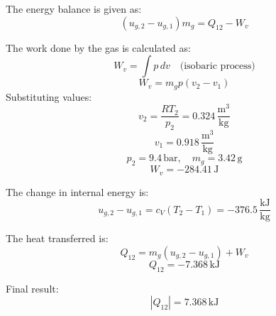The energy balance is given as:  
\[
(u_{g,2} - u_{g,1}) m_g = Q_{12} - W_v
\]  

The work done by the gas is calculated as:  
\[
W_v = \int p \, dv \quad \text{(isobaric process)}
\]  
\[
W_v = m_g p (v_2 - v_1)
\]  
Substituting values:  
\[
v_2 = \frac{R T_2}{p_2} = 0.324 \, \frac{\text{m}^3}{\text{kg}}
\]  
\[
v_1 = 0.918 \, \frac{\text{m}^3}{\text{kg}}
\]  
\[
p_2 = 9.4 \, \text{bar}, \quad m_g = 3.42 \, \text{g}
\]  
\[
W_v = -284.41 \, \text{J}
\]  

The change in internal energy is:  
\[
u_{g,2} - u_{g,1} = c_V (T_2 - T_1) = -376.5 \, \frac{\text{kJ}}{\text{kg}}
\]  

The heat transferred is:  
\[
Q_{12} = m_g (u_{g,2} - u_{g,1}) + W_v
\]  
\[
Q_{12} = -7.368 \, \text{kJ}
\]  

Final result:  
\[
|Q_{12}| = 7.368 \, \text{kJ}
\]